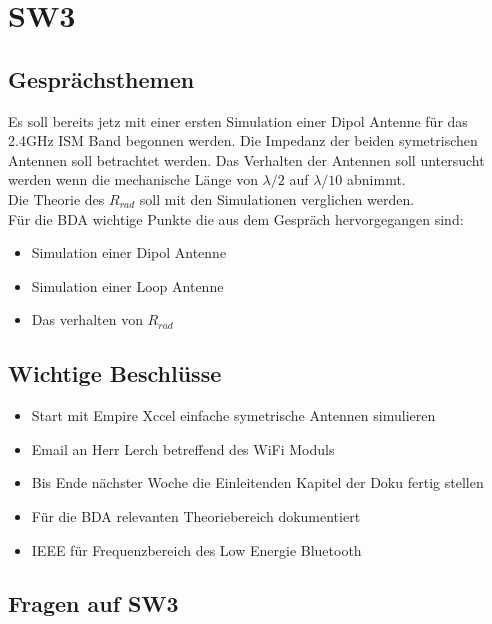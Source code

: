 \documentclass[10pt,a4paper]{article}
\begin{document}
\section{SW3}

\subsection{Gesprächsthemen}

Es soll bereits jetz mit einer ersten Simulation einer Dipol Antenne für das 2.4GHz ISM Band begonnen werden. Die Impedanz der beiden symetrischen Antennen soll betrachtet werden. Das Verhalten der Antennen soll untersucht werden wenn die mechanische Länge von $\lambda/2$ auf $\lambda /10 $ abnimmt. \\
Die Theorie des $R_{rad}$ soll mit den Simulationen verglichen werden.\\


Für die BDA wichtige Punkte die aus dem Gespräch hervorgegangen sind:
\begin{itemize}
	\item Simulation einer Dipol Antenne
	\item Simulation einer Loop Antenne
	\item Das verhalten von $R_{rad}$

\end{itemize}

\subsection{Wichtige Beschlüsse}

\begin{itemize}
	\item Start mit Empire Xccel einfache symetrische Antennen simulieren
	\item Email an Herr Lerch betreffend des WiFi Moduls
	\item Bis Ende nächster Woche die Einleitenden Kapitel der Doku fertig stellen
	\item Für die BDA relevanten Theoriebereich dokumentiert
	\item IEEE für Frequenzbereich des Low Energie Bluetooth
\end{itemize}

\subsection{Fragen auf SW3}
\end{document}

